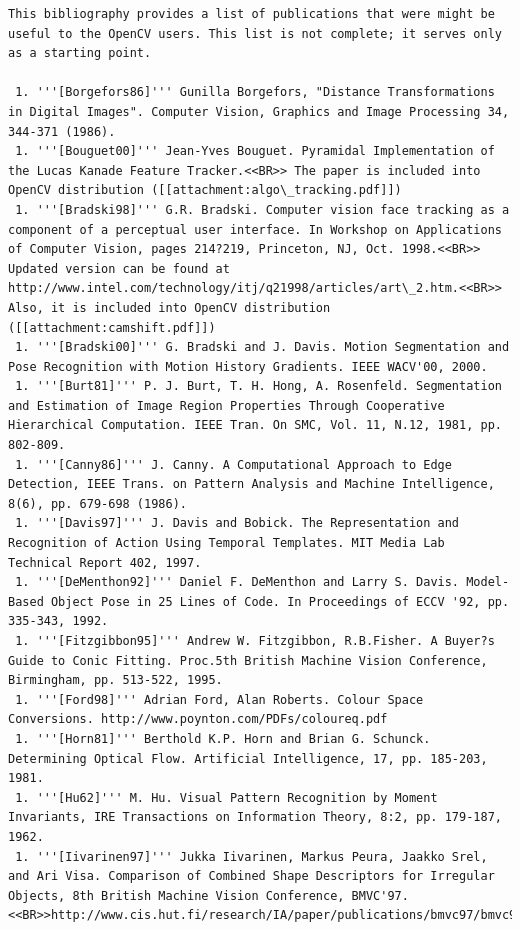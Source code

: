 \begin{verbatim}
This bibliography provides a list of publications that were might be useful to the OpenCV users. This list is not complete; it serves only as a starting point.

 1. '''[Borgefors86]''' Gunilla Borgefors, "Distance Transformations in Digital Images". Computer Vision, Graphics and Image Processing 34, 344-371 (1986).
 1. '''[Bouguet00]''' Jean-Yves Bouguet. Pyramidal Implementation of the Lucas Kanade Feature Tracker.<<BR>> The paper is included into OpenCV distribution ([[attachment:algo\_tracking.pdf]])
 1. '''[Bradski98]''' G.R. Bradski. Computer vision face tracking as a component of a perceptual user interface. In Workshop on Applications of Computer Vision, pages 214?219, Princeton, NJ, Oct. 1998.<<BR>> Updated version can be found at http://www.intel.com/technology/itj/q21998/articles/art\_2.htm.<<BR>> Also, it is included into OpenCV distribution ([[attachment:camshift.pdf]])
 1. '''[Bradski00]''' G. Bradski and J. Davis. Motion Segmentation and Pose Recognition with Motion History Gradients. IEEE WACV'00, 2000.
 1. '''[Burt81]''' P. J. Burt, T. H. Hong, A. Rosenfeld. Segmentation and Estimation of Image Region Properties Through Cooperative Hierarchical Computation. IEEE Tran. On SMC, Vol. 11, N.12, 1981, pp. 802-809.
 1. '''[Canny86]''' J. Canny. A Computational Approach to Edge Detection, IEEE Trans. on Pattern Analysis and Machine Intelligence, 8(6), pp. 679-698 (1986).
 1. '''[Davis97]''' J. Davis and Bobick. The Representation and Recognition of Action Using Temporal Templates. MIT Media Lab Technical Report 402, 1997.
 1. '''[DeMenthon92]''' Daniel F. DeMenthon and Larry S. Davis. Model-Based Object Pose in 25 Lines of Code. In Proceedings of ECCV '92, pp. 335-343, 1992.
 1. '''[Fitzgibbon95]''' Andrew W. Fitzgibbon, R.B.Fisher. A Buyer?s Guide to Conic Fitting. Proc.5th British Machine Vision Conference, Birmingham, pp. 513-522, 1995.
 1. '''[Ford98]''' Adrian Ford, Alan Roberts. Colour Space Conversions. http://www.poynton.com/PDFs/coloureq.pdf
 1. '''[Horn81]''' Berthold K.P. Horn and Brian G. Schunck. Determining Optical Flow. Artificial Intelligence, 17, pp. 185-203, 1981.
 1. '''[Hu62]''' M. Hu. Visual Pattern Recognition by Moment Invariants, IRE Transactions on Information Theory, 8:2, pp. 179-187, 1962.
 1. '''[Iivarinen97]''' Jukka Iivarinen, Markus Peura, Jaakko Srel, and Ari Visa. Comparison of Combined Shape Descriptors for Irregular Objects, 8th British Machine Vision Conference, BMVC'97.<<BR>>http://www.cis.hut.fi/research/IA/paper/publications/bmvc97/bmvc97.html

\end{verbatim}
